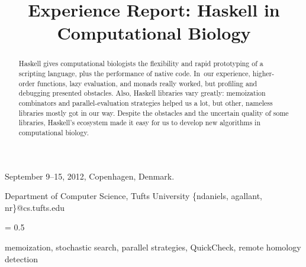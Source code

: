 \documentclass[preprint,nonatbib,blockstyle,times]{sigplanconf}
\begin{document}

\overfullrule=10pt


 {September 9--15, 2012, Copenhagen, Denmark.}

\iftimestamp
\preprintfooter{\mdfivestamp} 
\fi

\title{Experience Report: Haskell in Computational Biology}


           {Department of Computer Science, Tufts University}
           {{\rmfamily\{}ndaniels, agallant, nr{\rmfamily\}}@cs.tufts.edu}


\maketitle

%
%
%
\begin{abstract}
Haskell gives computational biologists
the flexibility and rapid prototyping of a scripting
language, plus the performance of native code.
In~our experience, higher-order functions, lazy evaluation, and
monads really worked, but
profiling and debugging presented obstacles.
Also, Haskell libraries vary greatly:
memoization combinators and parallel-evaluation
strategies helped us a lot,
but other, nameless libraries mostly got in our way.
Despite the obstacles and the uncertain quality of some libraries,
Haskell's ecosystem
made it easy for us to develop new algorithms in computational
biology.
\end{abstract}

\begingroup
\ifpagetuning
\makeatletter
\@paragraphaboveskip = 0.5\@paragraphaboveskip
\makeatother
\fi



% 
% 
\keywords
memoization, stochastic search, parallel strategies,  QuickCheck,
remote homology detection 
{\raggedright\par}
\end{document}
